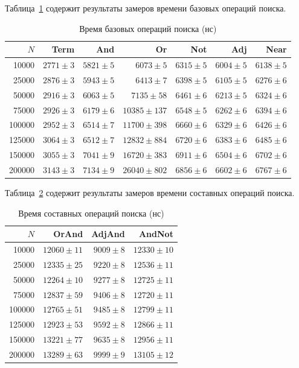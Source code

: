 \documentclass{itmo}
\begin{document}
Таблица~\ref{tab:search-basic} содержит результаты замеров времени базовых операций поиска.
\begin{table}[H]
	\centering
	\caption{Время базовых операций поиска (нс)}
	\label{tab:search-basic}
	\begin{tabular}{|r|r|r|r|r|r|r|}
		\toprule
		$N$ & Term & And & Or & Not & Adj & Near \\
		\midrule
		10000  & $2771 \pm 3$    & $5821 \pm 5$    & $6073 \pm 5$     & $6315 \pm 5$   & $6004 \pm 5$   & $6138 \pm 5$  \\
		25000  & $2876 \pm 3$    & $5943 \pm 5$    & $6413 \pm 7$     & $6398 \pm 5$   & $6105 \pm 5$   & $6276 \pm 6$  \\
		50000  & $2916 \pm 3$    & $6063 \pm 5$    & $7135 \pm 58$    & $6461 \pm 6$   & $6213 \pm 5$   & $6324 \pm 6$  \\
		75000  & $2926 \pm 3$    & $6179 \pm 6$    & $10385 \pm 137$  & $6548 \pm 5$   & $6262 \pm 6$   & $6394 \pm 6$  \\
		100000 & $2952 \pm 3$    & $6514 \pm 7$    & $11700 \pm 398$  & $6660 \pm 6$   & $6329 \pm 6$   & $6426 \pm 6$  \\
		125000 & $3064 \pm 3$    & $6512 \pm 7$    & $12832 \pm 884$  & $6720 \pm 6$   & $6383 \pm 6$   & $6485 \pm 6$  \\
		150000 & $3055 \pm 3$    & $7041 \pm 9$    & $16720 \pm 383$  & $6911 \pm 6$   & $6504 \pm 6$   & $6702 \pm 6$  \\
		200000 & $3143 \pm 3$    & $7134 \pm 9$    & $26040 \pm 802$  & $6856 \pm 6$   & $6602 \pm 6$   & $6767 \pm 6$  \\
		\bottomrule
	\end{tabular}
\end{table}

Таблица~\ref{tab:search-complex} содержит результаты замеров времени составных операций поиска.
\begin{table}[H]
	\centering
	\caption{Время составных операций поиска (нс)}
	\label{tab:search-complex}
	\begin{tabular}{|r|r|r|r|}
		\toprule
		$N$ & OrAnd & AdjAnd & AndNot \\
		\midrule
		10000  & $12060 \pm 11$ & $9009 \pm 8$   & $12330 \pm 10$ \\
		25000  & $12335 \pm 25$ & $9220 \pm 8$   & $12536 \pm 11$ \\
		50000  & $12264 \pm 10$ & $9277 \pm 8$   & $12725 \pm 11$ \\
		75000  & $12837 \pm 59$ & $9406 \pm 8$   & $12720 \pm 11$ \\
		100000 & $12765 \pm 51$ & $9485 \pm 8$   & $12799 \pm 11$ \\
		125000 & $12923 \pm 53$ & $9592 \pm 8$   & $12866 \pm 11$ \\
		150000 & $13221 \pm 77$ & $9635 \pm 8$   & $12956 \pm 11$ \\
		200000 & $13289 \pm 63$ & $9999 \pm 9$   & $13105 \pm 12$ \\
		\bottomrule
	\end{tabular}
\end{table}
\end{document}
